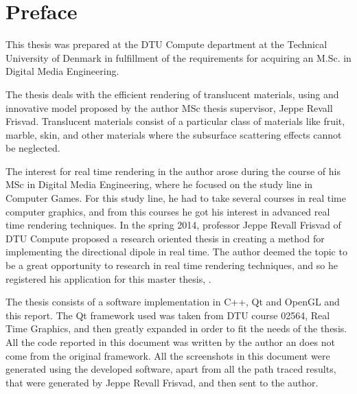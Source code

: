 \chapter{Preface}

\vspace{1cm}
This thesis was prepared at the DTU Compute department at the Technical University of Denmark in fulfillment of the requirements for acquiring an M.Sc. in Digital Media Engineering. 

The thesis deals with the efficient rendering of translucent materials, using and innovative model proposed by the author MSc thesis supervisor, Jeppe Revall Frisvad. Translucent materials consist of a particular class of materials like fruit, marble, skin, and other materials where the subsurface scattering effects cannot be neglected. 

The interest for real time rendering in the author arose during the course of his MSc in Digital Media Engineering, where he focused on the study line in Computer Games. For this study line, he had to take several courses in real time computer graphics, and from this courses he got his interest in advanced real time rendering techniques. In the spring 2014, professor Jeppe Revall Frisvad of DTU Compute proposed a research oriented thesis in creating a method for implementing the directional dipole in real time. The author deemed the topic to be a great opportunity to research in real time rendering techniques, and so he registered his application for this master thesis, \emph{\thesistitle}.

The thesis consists of a software implementation in C++, Qt and OpenGL and this report. The Qt framework used was taken from DTU course 02564, Real Time Graphics, and then greatly expanded in order to fit the needs of the thesis. All the code reported in this document was written by the author an does not come from the original framework. All the screenshots in this document were generated using the developed software, apart from all the path traced results, that were generated by Jeppe Revall Frisvad, and then sent to the author.

